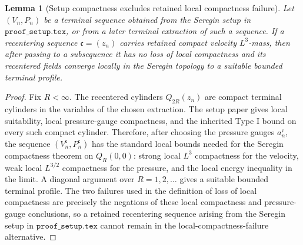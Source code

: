 \documentclass[11pt]{amsart}
\numberwithin{equation}{section}
\theoremstyle{plain}
\newtheorem{lemma}[theorem]{Lemma}
\theoremstyle{definition}
\theoremstyle{remark}
\begin{document}
\begin{lemma}[Setup compactness excludes retained local compactness failure]
\label{lem:rough-stratum-discharge}
Let \((V_n,P_n)\) be a terminal sequence obtained from the Seregin setup in
\(\texttt{proof\_setup.tex}\), or from a later terminal extraction of such a
sequence.
If a recentering sequence \(\mathfrak c=(z_n)\) carries retained compact
velocity \(L^3\)-mass, then
after passing to a subsequence it has no loss of local compactness and its
recentered fields
converge locally in the Seregin topology to a suitable bounded terminal
profile.
\end{lemma}

\begin{proof}
Fix \(R<\infty\).  The recentered cylinders \(Q_{2R}(z_n)\) are compact
terminal cylinders in the variables of the chosen extraction.  The setup paper
gives
local suitability, local pressure-gauge compactness, and the inherited Type I
bound on every such compact cylinder.  Therefore, after choosing the pressure
gauges \(a_n^{\mathfrak c}\), the sequence
\((V_n^{\mathfrak c},P_n^{\mathfrak c})\) has the standard local bounds needed
for the Seregin compactness theorem on \(Q_R(0,0)\): strong local \(L^3\)
compactness for the velocity, weak local \(L^{3/2}\) compactness for the
pressure, and the local energy inequality in the limit.  A diagonal argument
over \(R=1,2,\dots\) gives a suitable bounded terminal profile.  The two
failures used in the definition of loss of local compactness are precisely the
negations of these local compactness and pressure-gauge conclusions, so a
retained recentering sequence arising from the Seregin setup in
\(\texttt{proof\_setup.tex}\)
cannot remain in the local-compactness-failure alternative.
\end{proof}
\end{document}
